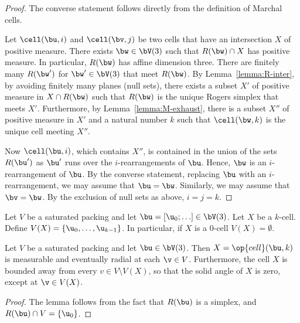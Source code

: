 \begin{proof} 
The converse statement follows directly from the definition of Marchal cells.

Let $\cell(\bu,i)$ and $\cell(\bv,j)$ be two cells that have an intersection
$X$ of positive measure.  There exists $\bw\in \bV(3)$ such that
$R(\bw)\cap X$ has positive measure.  In particular, $R(\bw)$ has
affine dimension three.  There are finitely many $R(\bw')$ for $\bw'\in
\bV(3)$ that meet $R(\bw)$.  By Lemma~\ref{lemma:R-inter}, by avoiding
finitely many planes (null sets), there exists a subset $X'$ of positive measure
in
$X\cap R(\bw)$ such that $R(\bw)$ is the unique Rogers simplex that
meets $X'$.  Furthermore, by Lemma~\ref{lemma:M-exhaust}, there is a subset $X''$ of
positive measure in $X'$ and a natural number $k$ such that $\cell(\bw,k)$ is
the unique cell meeting $X''$.

Now $\cell(\bu,i)$, which contains $X''$, 
is contained in the union of the sets $R(\bu')$ as $\bu'$ runs over the
$i$-rearrangements of $\bu$.  Hence, $\bw$ is an $i$-rearrangement of
$\bu$.  By the converse statement, replacing $\bu$ with an
$i$-rearrangement, we may assume that $\bu=\bw$.  Similarly, we may
assume that $\bv=\bw$.  By the exclusion of null sets as above, $i=j=k$.
\end{proof}



\begin{definition}
  Let $V$ be a saturated packing and let $\bu=[\u_0;\ldots]\in
  \bV(3)$.  Let $X$ be a $k$-cell.  Define $V(X) =
  \{\u_0,\ldots,\u_{k-1}\}$.  In particular, if $X$ is a $0$-cell
  $V(X)=\emptyset$.
\end{definition}


\begin{lemma}\label{lemma:cell-radial}
  Let $V$ be a saturated packing and let $\bu\in \bV(3)$.  Then
  $X=\op{cell}(\bu,k)$ is measurable and eventually radial at each
  $\v\in V$.  Furthermore, the cell $X$ is bounded away from every
  $v\in V\setminus V(X)$, so that the solid angle of $X$ is zero, except
  at $\v\in V(X)$.
\end{lemma}

\begin{proof} The lemma follows from the fact that $R(\bu)$ is a simplex, and
$R(\bu)\cap V = \{\u_0\}$.
\end{proof}



